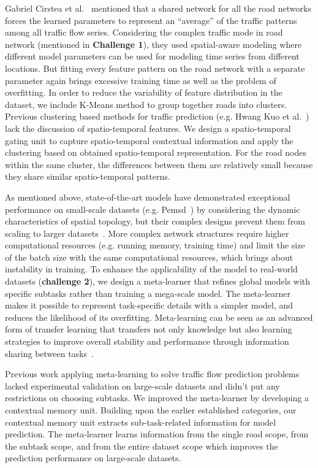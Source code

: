 \documentclass[lettersize,journal]{IEEEtran}
\begin{document}
Gabriel Cirstea et al.~\cite{DBLP:conf/icde/CirsteaYGKP22} mentioned that a shared network for all the road networks forces the learned parameters to represent an “average” of the traffic patterns among all traffic flow series.  Considering the complex traffic mode in road network (mentioned in \textbf{Challenge 1}), they used spatial-aware modeling where different model parameters can be used for modeling time series from different locations. But fitting every feature pattern on the road network with a separate parameter again brings excessive training time as well as the problem of overfitting. In order to reduce the variability of feature distribution in the dataset, we include K-Means method to group together roads into clusters. Previous clustering based methods for traffic prediction (e.g. Hwang Kuo et al.~\cite{kuo_adaptive_2001}) lack the discussion of spatio-temporal features. We design a spatio-temporal gating unit to capture spatio-temporal contextual information and apply the clustering based on obtained spatio-temporal representation. For the road nodes within the same cluster, the differences between them are relatively small because they share similar spatio-temporal patterns. 


As mentioned above, state-of-the-art models have demonstrated exceptional performance on small-scale datasets (e.g. Pemsd~\cite{PeMSD}) by considering the dynamic characteristics of spatial topology, but their complex designs prevent them from scaling to larger datasets~\cite{largest}. More complex network structures require higher computational resources (e.g. running memory, training time) and limit the size of the batch size with the same computational resources, which brings about instability in training. To enhance the applicability of the model to real-world datasets (\textbf{challenge 2}), we design a meta-learner that refines global models with specific subtasks rather than training a mega-scale model. The meta-learner makes it possible to represent task-specific details with a simpler model, and reduces the likelihood of its overfitting. Meta-learning can be seen as an advanced form of transfer learning that transfers not only knowledge but also learning strategies to improve overall stability and performance through information sharing between tasks~\cite{DBLP:journals/corr/FinnAL17}.

Previous work applying meta-learning to solve traffic flow prediction problems~\cite{pan_urban_2019}~\cite{zhang_efficient_2022}~\cite{wang_deep_2022} lacked experimental validation on large-scale datasets and didn't put any restrictions on choosing subtasks. We improved the meta-learner by developing a contextual memory unit. Building upon the earlier established categories, our contextual memory unit extracts sub-task-related information for model prediction. The meta-learner learns information from the single road scope, from the subtask scope, and from the entire dataset scope which improves the prediction performance on large-scale datasets.
\end{document}
